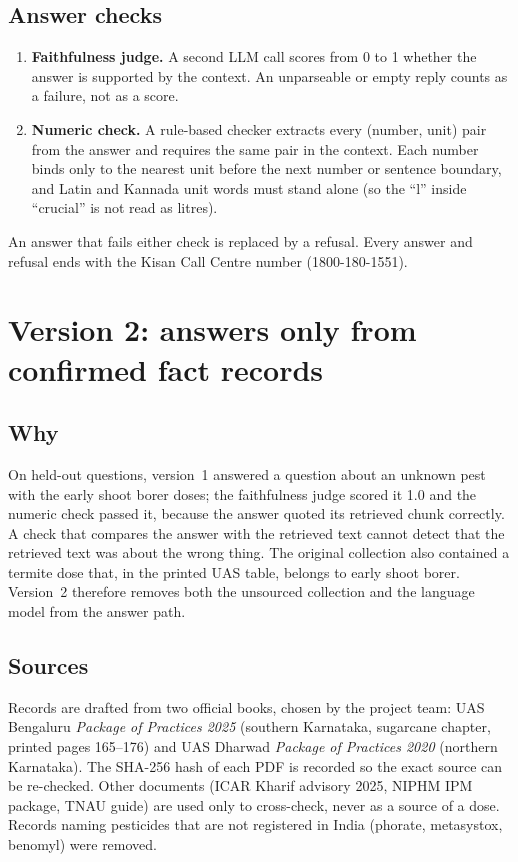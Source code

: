 \subsection{Answer checks}
\begin{enumerate}
  \item \textbf{Faithfulness judge.} A second LLM call scores from 0 to 1 whether the
    answer is supported by the context. An unparseable or empty reply counts as a failure,
    not as a score.
  \item \textbf{Numeric check.} A rule-based checker extracts every (number, unit) pair
    from the answer and requires the same pair in the context. Each number binds only to
    the nearest unit before the next number or sentence boundary, and Latin and Kannada
    unit words must stand alone (so the ``l'' inside ``crucial'' is not read as litres).
\end{enumerate}
An answer that fails either check is replaced by a refusal. Every answer and refusal
ends with the Kisan Call Centre number (1800-180-1551).

\section{Version 2: answers only from confirmed fact records}

\subsection{Why}
On held-out questions, version~1 answered a question about an unknown pest with the early
shoot borer doses; the faithfulness judge scored it 1.0 and the numeric check passed it,
because the answer quoted its retrieved chunk correctly. A check that compares the answer
with the retrieved text cannot detect that the retrieved text was about the wrong thing.
The original collection also contained a termite dose that, in the printed UAS table,
belongs to early shoot borer. Version~2 therefore removes both the unsourced collection
and the language model from the answer path.

\subsection{Sources}
Records are drafted from two official books, chosen by the project team:
UAS Bengaluru \emph{Package of Practices 2025} (southern Karnataka, sugarcane chapter,
printed pages 165--176) and UAS Dharwad \emph{Package of Practices 2020} (northern
Karnataka). The SHA-256 hash of each PDF is recorded so the exact source can be re-checked.
Other documents (ICAR Kharif advisory 2025, NIPHM IPM package, TNAU guide) are used only to
cross-check, never as a source of a dose. Records naming pesticides that are not registered
in India (phorate, metasystox, benomyl) were removed.

